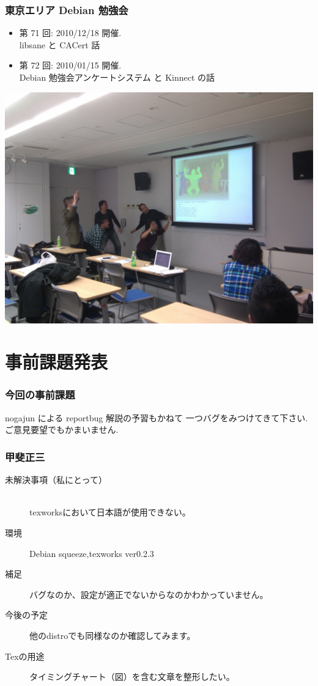 \documentclass[cjk,dvipdfmx,12pt,%
hyperref={bookmarks=true,bookmarksnumbered=true,bookmarksopen=false,%
colorlinks=false,%
pdftitle={第 43 回 関西 Debian 勉強会},%
pdfauthor={倉敷・のがた・佐々木},%
pdfsubject={資料},%
}]{beamer}
\begin{document}
\begin{frame}[fragile]
  \frametitle{東京エリア Debian 勉強会}
  \begin{itemize}
  \item 第 71 回: 2010/12/18 開催. \\ \qquad libsane と CACert 話
  \item 第 72 回: 2010/01/15 開催. \\ \qquad Debian 勉強会アンケートシステム と Kinnect の話
  \end{itemize}
  \centering
  \includegraphics[width=.5\textwidth]{./image201101/kinect.jpg}
\end{frame}



\section{事前課題発表}




\begin{frame}[fragile]
\frametitle{今回の事前課題}

\begin{block}{ nogajun による reportbug 解説の予習もかねて}
一つバグをみつけてきて下さい. ご意見要望でもかまいません.
\end{block}


\end{frame}




\begin{frame}[fragile]
\frametitle{ 甲斐正三 }
  \begin{description}
  \item [未解決事項（私にとって）]　\\
    texworksにおいて日本語が使用できない。
  \item [環境]
    Debian squeeze,texworks ver0.2.3
  \item [補足]
    バグなのか、設定が適正でないからなのかわかっていません。
  \item [今後の予定]
    他のdistroでも同様なのか確認してみます。
  \item [Texの用途]
    タイミングチャート（図）を含む文章を整形したい。
  \end{description}
\end{frame}
\end{document}
